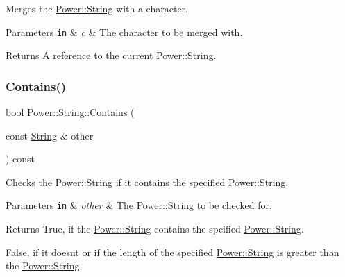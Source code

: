 Merges the \hyperlink{class_power_1_1_string}{Power\+::\+String} with a character. 


\begin{DoxyParams}[1]{Parameters}
\mbox{\tt in}  & {\em c} & The character to be merged with. \\
\hline
\end{DoxyParams}
\begin{DoxyReturn}{Returns}
A reference to the current \hyperlink{class_power_1_1_string}{Power\+::\+String}. 
\end{DoxyReturn}
\mbox{\label{class_power_1_1_string_aeaa32e499b49e67539953355b53609a8}} 
\subsubsection{\texorpdfstring{Contains()}{Contains()}\hspace{0.1cm}{\footnotesize\ttfamily [1/4]}}
{\footnotesize\ttfamily bool Power\+::\+String\+::\+Contains (\begin{DoxyParamCaption}\item[{const \hyperlink{class_power_1_1_string}{String} \&}]{other }\end{DoxyParamCaption}) const\hspace{0.3cm}{\ttfamily [inline]}}



Checks the \hyperlink{class_power_1_1_string}{Power\+::\+String} if it contains the specified \hyperlink{class_power_1_1_string}{Power\+::\+String}. 


\begin{DoxyParams}[1]{Parameters}
\mbox{\tt in}  & {\em other} & The \hyperlink{class_power_1_1_string}{Power\+::\+String} to be checked for. \\
\hline
\end{DoxyParams}
\begin{DoxyReturn}{Returns}
True, if the \hyperlink{class_power_1_1_string}{Power\+::\+String} contains the spcified \hyperlink{class_power_1_1_string}{Power\+::\+String}. 

False, if it doesn\textquotesingle{}t or if the length of the specified \hyperlink{class_power_1_1_string}{Power\+::\+String} is greater than the \hyperlink{class_power_1_1_string}{Power\+::\+String}. 
\end{DoxyReturn}
\mbox{\label{class_power_1_1_string_ad90a05c6e07bcd98684bd7c2aec7723f}} 
